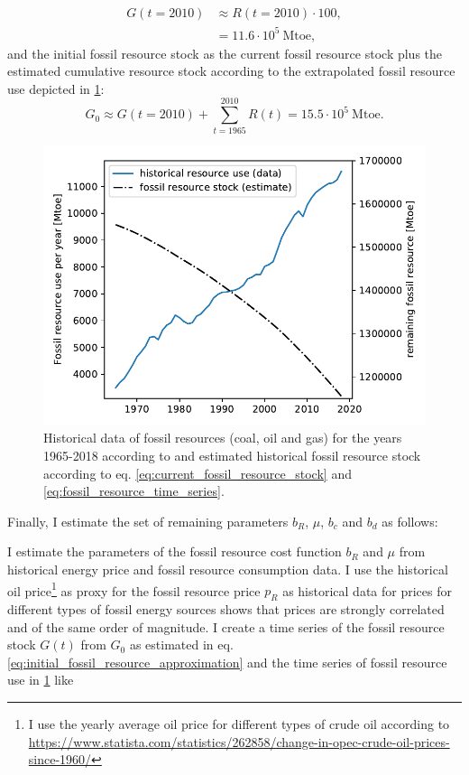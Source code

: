 \begin{align} 
  G(t=2010) 
  &\approx R(t=2010) \cdot 100, \nonumber \\
  &= 11.6 \cdot 10^{5} ~ \mathrm{Mtoe},
  \label{eq:current_fossil_resource_stock}
\end{align}
and the initial fossil resource stock as the current fossil resource stock plus the estimated cumulative resource stock according to the extrapolated fossil resource use depicted in \cref{fig:historical_resource_use}:
\begin{equation} 
  G_0 \approx G(t=2010) + \sum_{t=1965}^{2010} R(t) = 15.5 \cdot 10^{5} ~ \mathrm{Mtoe}.
  \label{eq:initial_fossil_resource_approximation}
\end{equation}
\begin{figure}
        \includegraphics[width = .68 \textwidth]{./figures/fossil_resource_per_year.pdf}
        \caption[Historical data of fossil resources]{Historical data of fossil resources (coal, oil and gas) for the years 1965-2018 according to \cite{dudley2019bp} and estimated historical fossil resource stock according to eq. \ref{eq:current_fossil_resource_stock} and \ref{eq:fossil_resource_time_series}. \label{fig:historical_resource_use}}
\end{figure}

Finally, I estimate the set of remaining parameters $b_R$, $\mu$, $b_c$ and $b_d$ as follows:

I estimate the parameters of the fossil resource cost function $b_R$ and $\mu$ from historical energy price and fossil resource consumption data. I use the historical oil price\footnote{I use the yearly average oil price for different types of crude oil according to \url{https://www.statista.com/statistics/262858/change-in-opec-crude-oil-prices-since-1960/}} as proxy for the fossil resource price $p_R$ as historical data for prices for different types of fossil energy sources \citep{owidfossilfuels} shows that prices are strongly correlated and of the same order of magnitude. I create a time series of the fossil resource stock $G(t)$ from $G_0$ as estimated in eq. \ref{eq:initial_fossil_resource_approximation} and the time series of fossil resource use in \cref{fig:historical_resource_use} like

